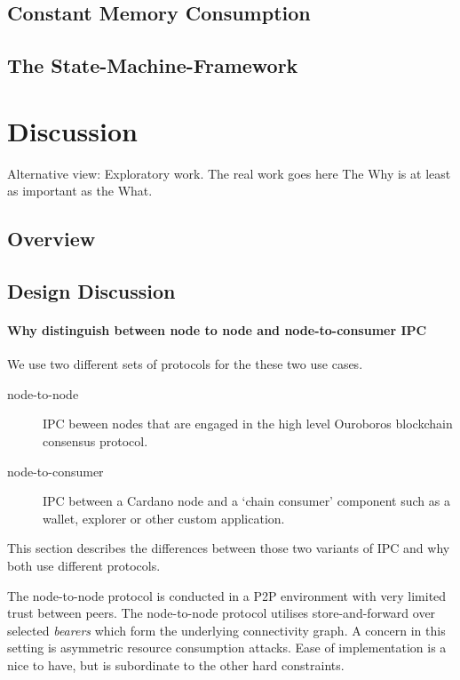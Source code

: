\documentclass{report}
\theoremstyle{definition}{
  \newtheorem{lemma}{Lemma}[section] %
  \newtheorem{definition}[lemma]{Definition}
}
\theoremstyle{theorem}{
  \newtheorem{invariant}[lemma]{Invariant}
  \newtheorem{proofobligation}[lemma]{Proof Obligation}
}
\numberwithin{equation}{lemma}
\begin{document}
\section{Constant Memory Consumption}
\section{The State-Machine-Framework}
\label{Haskell-state-machine}

\chapter{Discussion}
Alternative view: Exploratory work.
The real work goes here
The Why is at least as important as the What.
\section{Overview}
\section{Design Discussion}
\subsubsection{Why distinguish between node to node and node-to-consumer IPC}
\label{why_distinguish_protocols}
We use two different sets of protocols for the these two use cases.

\begin{description}
\item[node-to-node] IPC beween nodes that are engaged in the high level Ouroboros
      blockchain consensus protocol.
\item[node-to-consumer] IPC between a Cardano node and a `chain consumer' component such as a
      wallet, explorer or other custom application.
\end{description}

This section describes the differences between those two variants of IPC and why both use
different protocols.

The node-to-node protocol is conducted in a P2P environment
with very limited trust between peers. The node-to-node protocol utilises
store-and-forward over selected \emph{bearers} which form the underlying
connectivity graph. A concern in this setting is asymmetric resource consumption
attacks. Ease of implementation is a nice to have, but is subordinate to the
other hard constraints.
\end{document}
